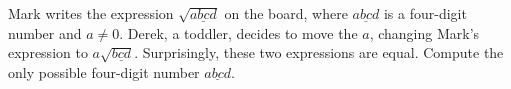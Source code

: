 Mark writes the expression $\sqrt{\underline{a b c d}}$ on the board, where $\underline{a b c d}$ is a four-digit number and $a \neq 0$. Derek, a toddler, decides to move the $a$, changing Mark's expression to $a \sqrt{\underline{b c d}}$. Surprisingly, these two expressions are equal. Compute the only possible four-digit number $\underline{a b c d}$.